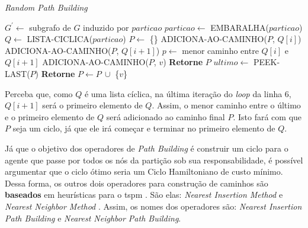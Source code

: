 \begin{algorithm}                   %
	\caption{\textit{Random Path Building}}          %
	\label{path_random}                           %
	\begin{algorithmic}[1]                   %
		\newline
		\State $G^{\prime} \gets $ subgrafo de $G$ induzido por $particao$
		\State $particao \gets $ EMBARALHA($particao$) 
		\State $Q \gets $ LISTA-CICLICA($particao$)
		\State $P \gets $ \{\} 
				\State ADICIONA-AO-CAMINHO($P$, $Q[i]$)
				\State ADICIONA-AO-CAMINHO($P$, $Q[i+1]$)
			\Else
				\State $p \gets $ menor caminho entre $Q[i]$ e $Q[i+1]$
					\State ADICIONA-AO-CAMINHO($P$, $v$)
				\EndFor
			\EndIf
		\EndFor
		\State \textbf{Retorne} $P$
		\EndProcedure
		\State $ultimo \gets $ PEEK-LAST($P$) 
			\State \textbf{Retorne}
		\Else
			\State $P \gets P\ \cup $ \{$v$\}
		\EndIf
		\EndProcedure
	\end{algorithmic}
\end{algorithm}

Perceba que, como $Q$ é uma lista cíclica, na última iteração do \textit{loop} 
da linha 6, $Q[i+1]$ será o primeiro elemento de $Q$. Assim, o menor caminho 
entre o último e o primeiro elemento de $Q$ será adicionado ao caminho final 
$P$. Isto fará com que $P$ seja um ciclo, já que ele irá começar e terminar no 
primeiro elemento de $Q$.

Já que o objetivo dos operadores de \textit{Path Building} é construir um ciclo 
para o agente que passe por todos os nós da partição sob sua responsabilidade, 
é possível argumentar que o ciclo ótimo seria um Ciclo Hamiltoniano de custo 
mínimo. Dessa forma, os outros dois operadores para construção de caminhos são 
\textbf{baseados} em heurísticas para o \ac{tspm} \citep{gutin2006traveling}. 
São elas: \textit{Nearest Insertion Method} e \textit{Nearest Neighbor Method} 
\citep{nilsson2003heuristics}. Assim, os nomes dos operadores são: 
\textit{Nearest Insertion Path Building} e 
\textit{Nearest Neighbor Path Building}.

